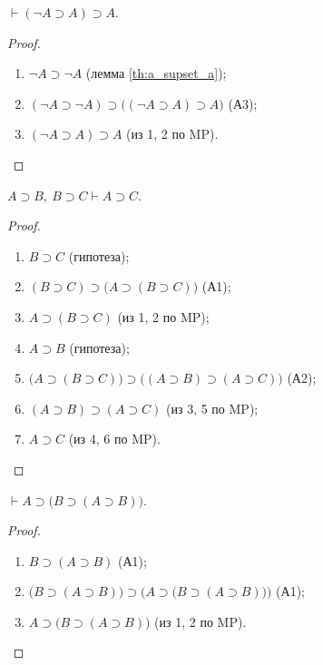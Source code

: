 \begin{lemma}
    $\vdash (\neg A \supset A) \supset A$.
\end{lemma}
\begin{proof}\leavevmode
    \begin{enumerate}
        \item $\neg A \supset \neg A$ (лемма \ref{th:a_supset_a});
        \item $(\neg A \supset \neg A) \supset \big((\neg A \supset A) \supset A\big)$ (А3);
        \item $(\neg A \supset A) \supset A$ (из 1, 2 по MP).
    \end{enumerate}
\end{proof}

\begin{lemma}\label{th:implication_transitivity}
    $A \supset B,\ B \supset C \vdash A \supset C$.
\end{lemma}
\begin{proof}\leavevmode
    \begin{enumerate}
        \item $B \supset C$ (гипотеза);
        \item $(B \supset C) \supset \big(A \supset (B \supset C)\big)$ (А1);
        \item $A \supset (B \supset C)$ (из 1, 2 по MP);
        \item $A \supset B$ (гипотеза);
        \item $\big(A \supset (B \supset C)\big) \supset \big((A \supset B) \supset (A \supset C)\big)$ (А2);
        \item $(A \supset B) \supset (A \supset C)$ (из 3, 5 по MP);
        \item $A \supset C$ (из 4, 6 по MP).
    \end{enumerate}
\end{proof}

\begin{lemma}
    $\vdash A \supset \big(B \supset (A \supset B)\big)$.
\end{lemma}
\begin{proof}\leavevmode
    \begin{enumerate}
        \item $B \supset (A \supset B)$ (А1);
        \item $\big(B \supset (A \supset B)\big) \supset \Big(A \supset \big(B \supset (A \supset B)\big)\Big)$ (А1);
        \item $A \supset \big(B \supset (A \supset B)\big)$ (из 1, 2 по MP).
    \end{enumerate}
\end{proof}

